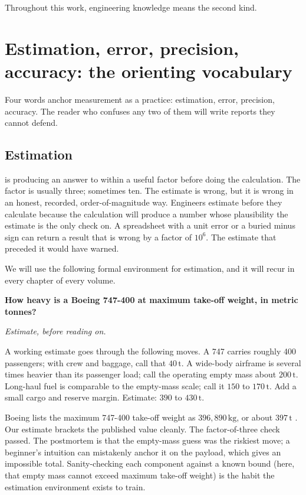 Throughout this work, engineering knowledge means the second kind.

\section{Estimation, error, precision, accuracy: the orienting
vocabulary}

Four words anchor measurement as a practice: estimation, error,
precision, accuracy. The reader who confuses any two of them will
write reports they cannot defend.

\subsection{Estimation}

 is producing an answer to within a useful factor
before doing the calculation. The factor is usually three; sometimes
ten. The estimate is wrong, but it is wrong in an honest, recorded,
order-of-magnitude way. Engineers estimate before they calculate
because the calculation will produce a number whose plausibility the
estimate is the only check on. A spreadsheet with a unit error or a
buried minus sign can return a result that is wrong by a factor of
$10^{6}$. The estimate that preceded it would have warned.

We will use the following formal environment for estimation, and it
will recur in every chapter of every volume.

\begin{estimation}
\textbf{How heavy is a Boeing 747-400 at maximum take-off weight, in
metric tonnes?}

\smallskip
\textit{Estimate, before reading on.}

\smallskip
A working estimate goes through the following moves. A 747 carries
roughly 400 passengers; with crew and baggage, call that
$40 \,\si{\tonne}$. A wide-body airframe is several times heavier than
its passenger load; call the operating empty mass about
$200 \,\si{\tonne}$. Long-haul fuel is comparable to the empty-mass
scale; call it $150$ to $170 \,\si{\tonne}$. Add a small cargo and
reserve margin. Estimate: $390$ to $430 \,\si{\tonne}$.

Boeing lists the maximum 747-400 take-off weight as
$396{,}890 \,\si{\kilogram}$, or about $397 \,\si{\tonne}$
\cite{web:boeing-commercial-reference}. Our estimate brackets the
published value cleanly. The factor-of-three check passed. The
postmortem is that the empty-mass guess was the riskiest move; a
beginner's intuition can mistakenly anchor it on the payload, which
gives an impossible total. Sanity-checking each component against a
known bound (here, that empty mass cannot exceed maximum take-off
weight) is the habit the estimation environment exists to train.
\end{estimation}

